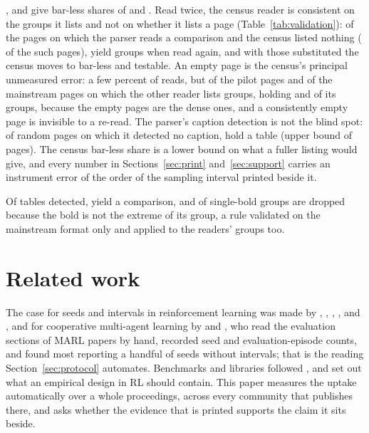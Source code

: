 \documentclass[sigconf,anonymous]{aamas}
\begin{document}
\nCcrSharedTestableAgreePct{}, and give bar-less shares of
\nCcrSharedFirstNeither{} and \nCcrSharedSecondNeither{}. Read twice, the
census reader is consistent on the groups it lists and not on whether it
lists a page (Table~\ref{tab:validation}): of the \nZrPages{} pages on
which the parser reads a comparison and the census listed nothing
(\nEcPagesPct{} of the \nEcParserPages{} such pages), \nZrPagesWithGroups{}
yield groups when read again, and with those substituted the census moves
to \nZruNeither{} bar-less and \nZruTestable{} testable. An empty page is
the census's principal unmeasured error: a few percent of reads, but
\nCcrPagesSecondEmptyPct{} of the pilot pages and
\nMsCrossPagesSecondEmptyPct{} of the mainstream pages on which the other
reader lists groups, holding \nCcrGroupsOnEmptyPagesPct{} and
\nMsCrossGroupsOnEmptyPagesPct{} of its groups, because the empty pages
are the dense ones, and a consistently empty page is invisible to a
re-read. The parser's
caption detection is not the blind spot: of \nNcPages{} random pages on
which it detected no caption, \nNcPagesAnyTable{} hold a table (upper
bound \nNcPagesAnyTableUpper{} of pages). The census bar-less share is a
lower bound on what a fuller listing would give, and every number in
Sections~\ref{sec:print} and~\ref{sec:support} carries an instrument
error of the order of the sampling interval printed beside it.

Of \nATablesDetected{} tables detected, \nATablesYielding{} yield a
comparison, and \nABoldNotExtremalPct{} of single-bold groups are dropped
because the bold is not the extreme of its group, a rule validated on the
mainstream format only and applied to the readers' groups too.

\section{Related work}
\label{sec:related}

The case for seeds and intervals in reinforcement learning was made by
\citet{henderson2017deep}, \citet{islam2017reproducibility},
\citet{colas2018how,colas2019hitchhiker}, \citet{jordan2020evaluating},
\citet{chan2020measuring} and \citet{agarwal2021deep}, and for cooperative
multi-agent learning by \citet{gorsane2022towards} and
\citet{singh2023how}, who read the evaluation sections of MARL papers by
hand, recorded seed and evaluation-episode counts, and found most
reporting a handful of seeds without intervals; that is the reading
Section~\ref{sec:protocol} automates. Benchmarks and libraries followed
\cite{papoudakis2021benchmarking,ellis2023smacv2,bettini2024benchmarl}, and
\citet{patterson2024empirical} set out what an empirical design in RL should
contain. This paper measures the uptake automatically over a whole
proceedings, across every community that publishes there, and asks
whether the evidence that is printed supports the claim it sits beside.
\end{document}
